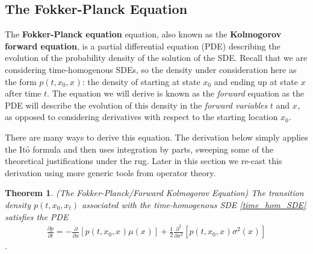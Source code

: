 \documentclass[12pt]{article}
\newcommand{\stateValue}[1][t]{x_{#1}}
\newcommand{\ito}{\text{It}\hat{\text{o}}}
\newtheorem{thm}{Theorem}
\begin{document}
\subsection{The Fokker-Planck Equation}
The \textbf{Fokker-Planck equation} equation, also known as the \textbf{Kolmogorov forward equation}, is a partial differential equation (PDE) describing the evolution of the 
probability density of the solution of the SDE. Recall that we are considering time-homogenous SDEs, so the density under consideration here as the form 
$p(t, \stateValue[0], \stateValue[])$: the density of starting at state $\stateValue[0]$ and ending up at state $\stateValue[]$ after time $t$. The equation we will derive is known 
as the \textit{forward} equation as the PDE will describe the evolution of this density in the \textit{forward variables} $t$ and $\stateValue[]$, as opposed to considering derivatives
with respect to the starting location $\stateValue[0]$. 

There are many ways to derive this equation. The derivation below simply applies the $\ito$ formula and then uses integration by parts, sweeping some of the theoretical 
justifications under the rug. Later in this section we re-cast this derivation using more generic tools from operator theory. 

\begin{thm}
(The Fokker-Planck/Forward Kolmogorov Equation) The transition density $p(t, \stateValue[0], \stateValue)$ associated with the time-homogenous SDE
\ref{time_hom_SDE} satisfies the PDE
\begin{align}
\frac{\partial p}{\partial t} = -\frac{\partial}{\partial x} [p(t, \stateValue[0], \stateValue[])\mu(\stateValue[])] + \frac{1}{2} \frac{\partial^2}{\partial x^2} [p(t, \stateValue[0], \stateValue[]) \sigma^2(\stateValue[])]
\end{align}.
\end{thm}
\end{document}
